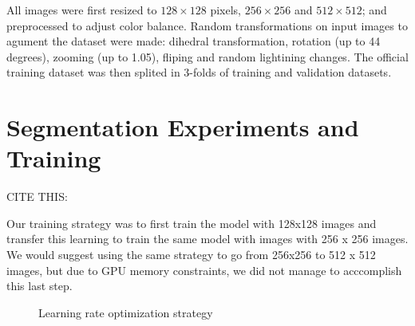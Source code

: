 \documentclass{article}
\begin{document}
All images were first resized to $128\times128$ pixels, $256\times256$ and $512\times512$; and preprocessed to adjust color balance. Random transformations on input images to agument the dataset were made: dihedral transformation, rotation (up to 44 degrees), zooming (up to 1.05), fliping and random lightining changes. The official training dataset was then splited in 3-folds of training and validation datasets.  



\section{Segmentation Experiments and Training}
\label{sec:seg_training}

CITE THIS: \cite{howard_ruder_acl2018}

Our training strategy was to first train the model with 128x128 images and transfer this learning to train the same model with images with 256 x 256 images. We would suggest using the same strategy to go from 256x256 to 512 x 512 images, but due to GPU memory constraints, we did not manage to acccomplish this last step.

\begin{figure}
  \centering
  \hfil
\caption{Learning rate optimization strategy}\label{lr_find_chart}
\end{figure}
\end{document}

